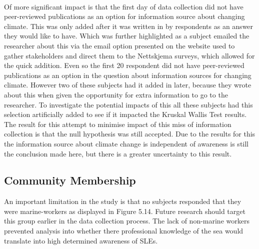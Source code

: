 \paragraph{}
Of more significant impact is that the first day of data collection did not have peer-reviewed publications as an option for information source about changing climate. This was only added after it was written in by respondents as an answer they would like to have. Which was further highlighted as a subject emailed the researcher about this via the email option presented on the website used to gather stakeholders and direct them to the Nettskjema surveys, which allowed for the quick addition. Even so the first 20 respondent did not have peer-reviewed publications as an option in the question about information sources for changing climate. However two of these subjects had it added in later, because they wrote about this when given the opportunity for extra information to go to the researcher. To investigate the potential impacts of this all these subjects had this selection artificially added to see if it impacted the Kruskal Wallis Test results. The result for this attempt to minimise impact of this miss of information collection is that the null hypothesis was still accepted. Due to the results for this the information source about climate change is independent of awareness is still the conclusion made here, but there is a greater uncertainty to this result.
\paragraph{}


\subsection{Community Membership}
An important limitation in the study is that no subjects responded that they were marine-workers as displayed in Figure 5.14. Future research should target this group earlier in the data collection process. The lack of non-marine workers prevented analysis into whether there professional knowledge of the sea would translate into high determined awareness of SLEs.
\paragraph{}

